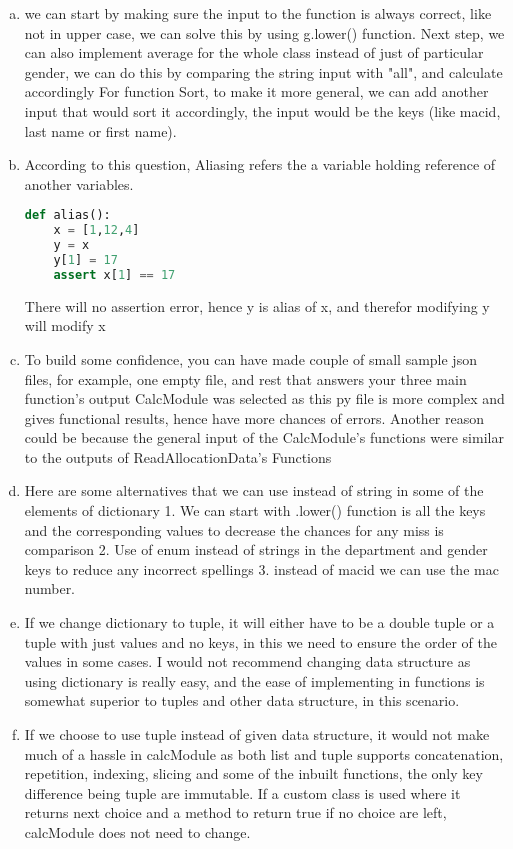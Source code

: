 \documentclass[12pt]{article}
\begin{document}
\begin{enumerate}[(a)]

\item 
we can start by making sure the input to the function is always correct, like not in upper case,
we can solve this by using g.lower() function.
Next step, we can also implement average for the whole class instead of just of
particular gender, we can do this by comparing the string input with "all", and calculate accordingly
For function Sort, to make it more general, we can add another input that would sort it accordingly, the input
would be the keys (like macid, last name or first name).
\item
According to this question, Aliasing refers the a variable holding reference of another variables.


\begin{lstlisting}[language=Python]
def alias():
	x = [1,12,4]
	y = x
	y[1] = 17
	assert x[1] == 17
\end{lstlisting}
There will no assertion error, hence y is alias of x, and therefor modifying y will modify x
\item 
To build some confidence, you can have made couple of small sample json files, for example, one empty file, and rest that answers your three main function's output
CalcModule was selected as this py file is more complex and gives functional results, hence have more chances of errors.
Another reason could be because the general input of the CalcModule's functions were similar to the outputs of ReadAllocationData's Functions

\item 
Here are some alternatives that we can use instead of string in some of the elements of dictionary
1. We can start with .lower() function is all the keys and the corresponding values to decrease the chances for any miss is comparison
2. Use of enum instead of strings in the department and gender keys to reduce any incorrect spellings
3. instead of macid we can use the mac number.

\item 
If we change dictionary to tuple, it will either have to be a double tuple or a tuple with just values and no keys, in this we need to ensure the order of the values in some cases.
I would not recommend changing data structure as using dictionary is really easy, and the ease of implementing in functions is somewhat superior to tuples and other data structure, in this scenario.
\item 
If we choose to use tuple instead of given data structure, it would not make much of a hassle in calcModule as both list and tuple supports concatenation, repetition, indexing, slicing and some of the inbuilt functions, the only key difference being tuple are immutable. 
If a custom class is used where it returns next choice and a method to return true if no choice are left, calcModule does not need to change. 
\end{enumerate}
\end{document}
